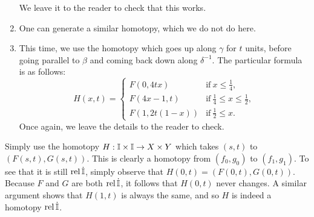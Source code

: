 \documentclass[../../solutions.tex]{subfiles}
\begin{document}
\begin{exercise}
\begin{enumerate}
We leave it to the reader to check that this works. 

\item One can generate a similar homotopy, which we do not do here. 

\item This time, we use the homotopy which goes up along $\gamma$ for $t$ units, before going parallel to $\beta$ and coming back down along $\delta^{-1}$. The particular formula is as follows: 
\[H(x,t)=\begin{cases}F(0,4tx)&\text{if}~x\le\frac14,\\F(4x-1,t)&\text{if}~\frac14\le x\le\frac12,\\F(1,2t(1-x))&\text{if}~\frac12\le x.\end{cases}\] Once again, we leave the details to the reader to check. 
\end{enumerate} 
\end{exercise} 

\begin{exercise} \leavevmode
Simply use the homotopy $H:\mathbb I\times\mathbb I\to X\times Y$ which takes $(s,t)$ to $(F(s,t),G(s,t))$. This is clearly a homotopy from $(f_0,g_0)$ to $(f_1,g_1)$. To see that it is still $\operatorname{rel}\dot{\mathbb I}$, simply observe that $H(0,t)=(F(0,t),G(0,t))$. Because $F$ and $G$ are both $\operatorname{rel}\dot{\mathbb I}$, it follows that $H(0,t)$ never changes. A similar argument shows that $H(1,t)$ is always the same, and so $H$ is indeed a homotopy $\operatorname{rel}\dot{\mathbb I}$. 
\end{exercise} 
\end{document}
